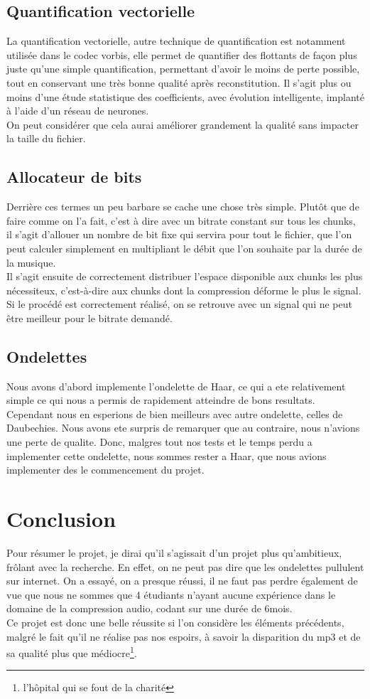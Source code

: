 \documentclass[a4paper,12pt]{report}
\begin{document}
\section{Quantification vectorielle}
La quantification vectorielle, autre technique de quantification est notamment
utilisée dans le codec vorbis, elle permet de quantifier des flottants de façon
plus juste qu'une simple quantification, permettant d'avoir le moins de perte
possible, tout en conservant une très bonne qualité après reconstitution. Il
s'agit plus ou moins d'une étude statistique des coefficients, avec évolution
intelligente, implanté à l'aide d'un réseau de neurones.\\
On peut considérer que cela aurai améliorer grandement la qualité sans impacter
la taille du fichier.
\section{Allocateur de bits}
Derrière ces termes un peu barbare se cache une chose très simple. Plutôt que de
faire comme on l'a fait, c'est à dire avec un bitrate constant sur tous les
chunks, il s'agit d'allouer un nombre de bit fixe qui servira pour tout le
fichier, que l'on peut calculer simplement en multipliant le débit que l'on
souhaite par la durée de la musique.\\
Il s'agit ensuite de correctement distribuer l'espace disponible aux chunks les
plus nécessiteux, c'est-à-dire aux chunks dont la compression déforme le plus le
signal. Si le procédé est correctement réalisé, on se retrouve avec un signal
qui ne peut être meilleur pour le bitrate demandé.
\section{Ondelettes}
Nous avons d'abord implemente l'ondelette de Haar, ce qui a ete
relativement simple ce qui nous a permis de rapidement atteindre de
bons resultats. Cependant nous en esperions de bien meilleurs avec
autre ondelette,  celles de Daubechies. Nous avons ete surpris de
remarquer que au contraire, nous n'avions une perte de qualite. Donc,
malgres tout nos tests et le temps perdu a implementer cette
ondelette, nous sommes rester a Haar, que nous avions implementer des
le commencement du projet.
\chapter{Conclusion}
Pour résumer le projet, je dirai qu'il s'agissait d'un projet plus qu'ambitieux,
frôlant avec la recherche. En effet, on ne peut pas dire que les ondelettes
pullulent sur internet. On a essayé, on a presque réussi, il ne faut pas perdre
également de vue que nous ne sommes que 4 étudiants n'ayant aucune expérience
dans le domaine de la compression audio, codant sur une durée de 6mois.\\
Ce projet est donc une belle réussite si l'on considère les éléments
précédents, malgré le fait qu'il ne réalise pas nos espoirs, à savoir la
disparition du mp3 et de sa qualité plus que médiocre\footnote{l'hôpital qui se
fout de la charité}.
\end{document}
